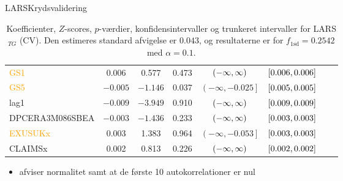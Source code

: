 \begin{frame}{LARS}{Krydsvalidering}
\begin{table}[ht]
{\begin{tabular}{lccccccc}
\textcolor{orange}{GS1} &   0.006&   0.577    &0.473  &    $\del{-\infty  ,  \infty}$  &$\sbr{0.006 ,0.006}$ \\  
\textcolor{orange}{GS5} & $-0.005$ & $-1.146 $ &0.037 &     $\left( -\infty ,  -0.025\right]   $ & $\sbr{0.005 ,0.005 }$\\  
 \textcolor{blue3}{lag1}  & $-0.009$  &$-3.949$   & 0.910   & $\del{-\infty  ,  \infty }$  &$\sbr{0.009, 0.009 }$ \\ 
 \textcolor{red3}{DPCERA3M086SBEA} & $- 0.003$ & $-1.436$ & 0.233  &   $\del{-\infty   ,  \infty }$ &  $\sbr{0.003, 0.003}$ \\ 
\textcolor{orange}{ EXUSUKx}  &  0.003   &1.383 & 0.964   &   $\left( -\infty     ,-0.053 \right] $&  $\sbr{0.003, 0.003 }$   \\   
 \textcolor{blue3}{CLAIMSx} &0.002 &  0.813   & 0.226 &    $\del{-\infty  ,  \infty}$& $\sbr{0.002 ,0.002 }$   \\ 
\bottomrule
\end{tabular}  
}
\caption{Koefficienter, \(Z\)-scores, \(p\)-værdier, konfidensintervaller og trunkeret intervaller for LARS$_{TG}$ (CV). Den estimeres standard afvigelse er \(0.043\), og resultaterne er for \(f_{1 \text{sd}} = 0.2542\) med \(\alpha = 0.1\).} \label{tab:larInf_kryds}
\end{table} 
\begin{itemize}
\item afviser normalitet samt at de første 10 autokorrelationer er nul
\end{itemize}
\end{frame}


